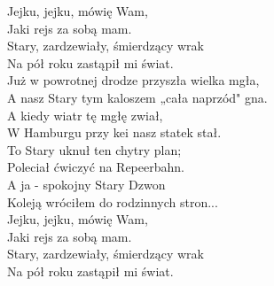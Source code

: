 Jejku, jejku, mówię Wam, \\
Jaki rejs za sobą mam. \\
Stary, zardzewiały, śmierdzący wrak \\
Na pół roku zastąpił mi świat. \\

Już w powrotnej drodze przyszła wielka mgła, \\
A nasz Stary tym kaloszem „cała naprzód" gna. \\
A kiedy wiatr tę mgłę zwiał, \\
W Hamburgu przy kei nasz statek stał. \\
To Stary uknuł ten chytry plan; \\
Poleciał ćwiczyć na Repeerbahn. \\
A ja - spokojny Stary Dzwon \\
Koleją wróciłem do rodzinnych stron... \\

Jejku, jejku, mówię Wam, \\
Jaki rejs za sobą mam. \\
Stary, zardzewiały, śmierdzący wrak \\
Na pół roku zastąpił mi świat.